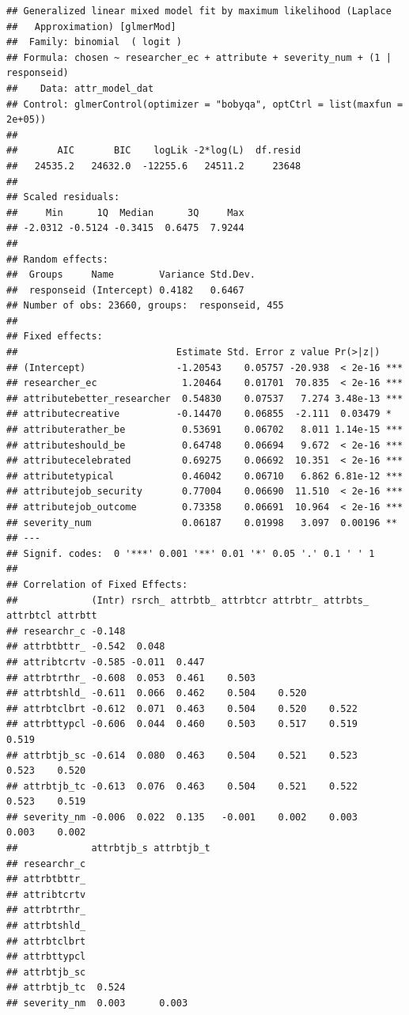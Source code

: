 \documentclass[
]{article}
\begin{document}
\begin{verbatim}
## Generalized linear mixed model fit by maximum likelihood (Laplace
##   Approximation) [glmerMod]
##  Family: binomial  ( logit )
## Formula: chosen ~ researcher_ec + attribute + severity_num + (1 | responseid)
##    Data: attr_model_dat
## Control: glmerControl(optimizer = "bobyqa", optCtrl = list(maxfun = 2e+05))
## 
##       AIC       BIC    logLik -2*log(L)  df.resid 
##   24535.2   24632.0  -12255.6   24511.2     23648 
## 
## Scaled residuals: 
##     Min      1Q  Median      3Q     Max 
## -2.0312 -0.5124 -0.3415  0.6475  7.9244 
## 
## Random effects:
##  Groups     Name        Variance Std.Dev.
##  responseid (Intercept) 0.4182   0.6467  
## Number of obs: 23660, groups:  responseid, 455
## 
## Fixed effects:
##                            Estimate Std. Error z value Pr(>|z|)    
## (Intercept)                -1.20543    0.05757 -20.938  < 2e-16 ***
## researcher_ec               1.20464    0.01701  70.835  < 2e-16 ***
## attributebetter_researcher  0.54830    0.07537   7.274 3.48e-13 ***
## attributecreative          -0.14470    0.06855  -2.111  0.03479 *  
## attributerather_be          0.53691    0.06702   8.011 1.14e-15 ***
## attributeshould_be          0.64748    0.06694   9.672  < 2e-16 ***
## attributecelebrated         0.69275    0.06692  10.351  < 2e-16 ***
## attributetypical            0.46042    0.06710   6.862 6.81e-12 ***
## attributejob_security       0.77004    0.06690  11.510  < 2e-16 ***
## attributejob_outcome        0.73358    0.06691  10.964  < 2e-16 ***
## severity_num                0.06187    0.01998   3.097  0.00196 ** 
## ---
## Signif. codes:  0 '***' 0.001 '**' 0.01 '*' 0.05 '.' 0.1 ' ' 1
## 
## Correlation of Fixed Effects:
##             (Intr) rsrch_ attrbtb_ attrbtcr attrbtr_ attrbts_ attrbtcl attrbtt
## researchr_c -0.148                                                            
## attrbtbttr_ -0.542  0.048                                                     
## attribtcrtv -0.585 -0.011  0.447                                              
## attrbtrthr_ -0.608  0.053  0.461    0.503                                     
## attrbtshld_ -0.611  0.066  0.462    0.504    0.520                            
## attrbtclbrt -0.612  0.071  0.463    0.504    0.520    0.522                   
## attrbttypcl -0.606  0.044  0.460    0.503    0.517    0.519    0.519          
## attrbtjb_sc -0.614  0.080  0.463    0.504    0.521    0.523    0.523    0.520 
## attrbtjb_tc -0.613  0.076  0.463    0.504    0.521    0.522    0.523    0.519 
## severity_nm -0.006  0.022  0.135   -0.001    0.002    0.003    0.003    0.002 
##             attrbtjb_s attrbtjb_t
## researchr_c                      
## attrbtbttr_                      
## attribtcrtv                      
## attrbtrthr_                      
## attrbtshld_                      
## attrbtclbrt                      
## attrbttypcl                      
## attrbtjb_sc                      
## attrbtjb_tc  0.524               
## severity_nm  0.003      0.003
\end{verbatim}
\end{document}
